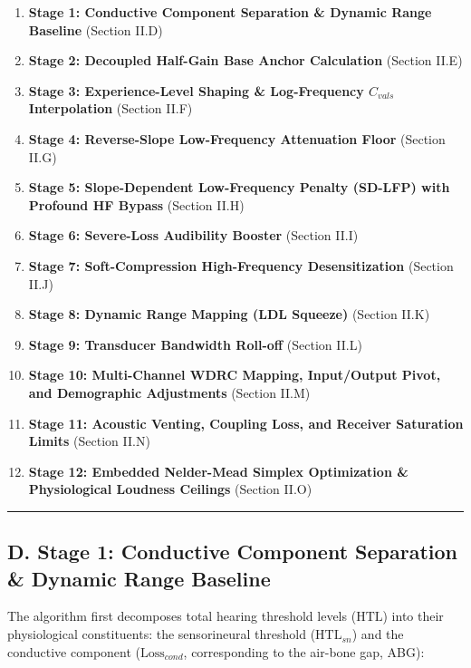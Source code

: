 \documentclass[
]{article}
\providecommand{\tightlist}{%
  \setlength{\itemsep}{0pt}\setlength{\parskip}{0pt}}
\begin{document}
\begin{enumerate}
\def\labelenumi{\arabic{enumi}.}
\tightlist
\item
  \textbf{Stage 1: Conductive Component Separation \& Dynamic Range
  Baseline} (Section II.D)
\item
  \textbf{Stage 2: Decoupled Half-Gain Base Anchor Calculation} (Section
  II.E)
\item
  \textbf{Stage 3: Experience-Level Shaping \& Log-Frequency
  \(C_{vals}\) Interpolation} (Section II.F)
\item
  \textbf{Stage 4: Reverse-Slope Low-Frequency Attenuation Floor}
  (Section II.G)
\item
  \textbf{Stage 5: Slope-Dependent Low-Frequency Penalty (SD-LFP) with
  Profound HF Bypass} (Section II.H)
\item
  \textbf{Stage 6: Severe-Loss Audibility Booster} (Section II.I)
\item
  \textbf{Stage 7: Soft-Compression High-Frequency Desensitization}
  (Section II.J)
\item
  \textbf{Stage 8: Dynamic Range Mapping (LDL Squeeze)} (Section II.K)
\item
  \textbf{Stage 9: Transducer Bandwidth Roll-off} (Section II.L)
\item
  \textbf{Stage 10: Multi-Channel WDRC Mapping, Input/Output Pivot, and
  Demographic Adjustments} (Section II.M)
\item
  \textbf{Stage 11: Acoustic Venting, Coupling Loss, and Receiver
  Saturation Limits} (Section II.N)
\item
  \textbf{Stage 12: Embedded Nelder-Mead Simplex Optimization \&
  Physiological Loudness Ceilings} (Section II.O)
\end{enumerate}

\begin{center}\rule{0.5\linewidth}{0.5pt}\end{center}

\subsection{D. Stage 1: Conductive Component Separation \& Dynamic Range
Baseline}\label{d.-stage-1-conductive-component-separation-dynamic-range-baseline}

The algorithm first decomposes total hearing threshold levels
(\(\text{HTL}\)) into their physiological constituents: the
sensorineural threshold (\(\text{HTL}_{sn}\)) and the conductive
component (\(\text{Loss}_{cond}\), corresponding to the air-bone gap,
ABG):
\end{document}
